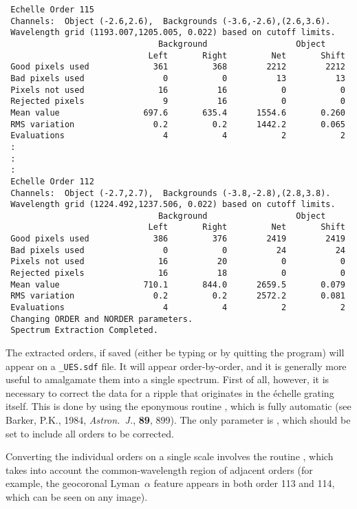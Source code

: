 \begin{verbatim}
 Echelle Order 115
 Channels:  Object (-2.6,2.6),  Backgrounds (-3.6,-2.6),(2.6,3.6).
 Wavelength grid (1193.007,1205.005, 0.022) based on cutoff limits.
                               Background                  Object
                             Left       Right         Net       Shift
 Good pixels used             361         368        2212        2212
 Bad pixels used                0           0          13          13
 Pixels not used               16          16           0           0
 Rejected pixels                9          16           0           0
 Mean value                 697.6       635.4      1554.6       0.260
 RMS variation                0.2         0.2      1442.2       0.065
 Evaluations                    4           4           2           2
 :
 :
 :
 Echelle Order 112
 Channels:  Object (-2.7,2.7),  Backgrounds (-3.8,-2.8),(2.8,3.8).
 Wavelength grid (1224.492,1237.506, 0.022) based on cutoff limits.
                               Background                  Object
                             Left       Right         Net       Shift
 Good pixels used             386         376        2419        2419
 Bad pixels used                0           0          24          24
 Pixels not used               16          20           0           0
 Rejected pixels               16          18           0           0
 Mean value                 710.1       844.0      2659.5       0.079
 RMS variation                0.2         0.2      2572.2       0.081
 Evaluations                    4           4           2           2
 Changing ORDER and NORDER parameters.
 Spectrum Extraction Completed.
\end{verbatim}

The extracted orders, if saved (either be typing  
or by quitting
the program) will appear on a \verb+_UES.sdf+ file.  It will appear
order-by-order, and it is generally more useful to amalgamate them into a
single spectrum.  First of all, however, it is necessary to correct the data
for a ripple that originates in the \'{e}chelle grating itself.  This is done
by using the eponymous routine , 
which is fully automatic (see
Barker, P.K., 1984, {\it Astron.~J.}, {\bf 89}, 899).  The only parameter is
, 
which should be set to include all orders to be corrected.

Converting the individual orders on a single scale involves the routine
, 
which takes into account the common-wavelength region of adjacent
orders (for example, the geocoronal Lyman~$\alpha$ feature appears in both
order 113 and 114, which can be seen on any image).

